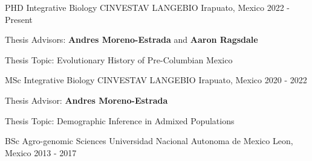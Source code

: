 

\begin{cventries}

\cventry
    {PHD Integrative Biology} %
    {CINVESTAV LANGEBIO} %
    {Irapuato, Mexico} %
    {2022 - Present} %
    {
      \begin{cvitems} %
      \item {Thesis Advisors: \textbf{Andres Moreno-Estrada} and \textbf{Aaron Ragsdale}}
      \item {Thesis Topic: Evolutionary History of Pre-Columbian Mexico}
      \end{cvitems}
    }

\cventry
    {MSc Integrative Biology} %
    {CINVESTAV LANGEBIO} %
    {Irapuato, Mexico} %
    {2020 - 2022} %
    {
      \begin{cvitems} %
      \item {Thesis Advisor: \textbf{Andres Moreno-Estrada}}
      \item {Thesis Topic: Demographic Inference in Admixed Populations}
      \end{cvitems}
    }
    
  \cventry
    {BSc Agro-genomic Sciences} %
    {Universidad Nacional Autonoma de Mexico} %
    {Leon, Mexico} %
    {2013 - 2017} %
    {
      \begin{cvitems} %
      \end{cvitems}
    }
\end{cventries}
